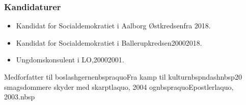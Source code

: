 \documentclass[11pt, a4paper]{awesome-cv}
\begin{document}
\begin{cvletter}
\subsubsection*{Kandidaturer}
\begin{itemize}
\item Kandidat for Socialdemokratiet i Aalborg Østkredsenfra 2018.
\item Kandidat for Socialdemokratiet i Ballerupkredsen20002018.
\end{itemize}
\begin{itemize}
\item Ungdomskonsulent i LO,20002001.
\end{itemize}
Medforfatter til boslashgernenbspraquoFra kamp til kulturnbspndashnbsp20 smagsdommere skyder med skarptlaquo, 2004 ognbspraquoEpostlerlaquo, 2003.nbsp

\end{cvletter}
\end{document}
